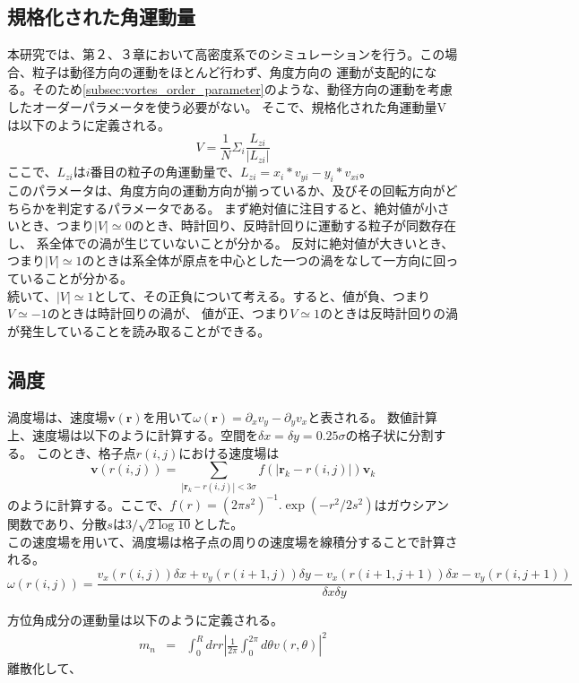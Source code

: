 \documentclass[/Users/ikedahajime/GitHub/reserch/master_report/thesis]{subfiles}
\begin{document}
\subsection{規格化された角運動量}
本研究では、第２、３章において高密度系でのシミュレーションを行う。この場合、粒子は動径方向の運動をほとんど行わず、角度方向の
運動が支配的になる。そのため\ref{subsec:vortes_order_parameter}のような、動径方向の運動を考慮したオーダーパラメータを使う必要がない。
そこで、規格化された角運動量V\cite{jiangEmergenceCollectiveDynamical2017}\cite{capriniCollectiveEffectsConfined2021}は以下のように定義される。
\begin{equation}
    V=\frac{1}{N}\Sigma_i \frac{L_{zi}}{ |L_{zi}|}
\end{equation}
ここで、$L_{zi}$は$i$番目の粒子の角運動量で、$L_{zi}=x_i*v_{yi}-y_i*v_{xi}$。\\
このパラメータは、角度方向の運動方向が揃っているか、及びその回転方向がどちらかを判定するパラメータである。
まず絶対値に注目すると、絶対値が小さいとき、つまり$|V|\simeq 0$のとき、時計回り、反時計回りに運動する粒子が同数存在し、
系全体での渦が生じていないことが分かる。
反対に絶対値が大きいとき、つまり$|V|\simeq 1$のときは系全体が原点を中心とした一つの渦をなして一方向に回っていることが分かる。\\
続いて、$|V|\simeq 1$として、その正負について考える。すると、値が負、つまり$V\simeq -1$のときは時計回りの渦が、
値が正、つまり$V\simeq 1$のときは反時計回りの渦が発生していることを読み取ることができる。

\subsection{渦度}
渦度場は、速度場$\bm{v}(\bm{r})$を用いて$\omega(\bm{r})=\partial_x v_y -\partial_y v_x$と表される。
数値計算上、速度場は以下のように計算する。空間を$\delta x=\delta y=0.25 \sigma$の格子状に分割する。
このとき、格子点$r(i,j)$における速度場は%
\begin{equation}
    \bm{v}(r(i,j))=\sum_{\left|\bm{r}_k-r(i,j)\right|<3\sigma} f(\left|\bm{r}_k-r(i,j)\right|)\bm{v}_k
\end{equation}
のように計算する。ここで、$f(r)=(2\pi s^2)^{-1}. \exp(-r^2/2s^2)$はガウシアン関数であり、分散$s$は$3/\sqrt{2\log 10}$とした。\\
この速度場を用いて、渦度場は格子点の周りの速度場を線積分することで計算される。
\begin{equation}
    \omega (r(i,j))=\frac{v_x(r(i,j))\delta x +v_y(r(i+1,j)) \delta y -v_x(r(i+1,j+1))\delta x -v_y(r(i,j+1))}{\delta x \delta y}
\end{equation}


方位角成分の運動量は以下のように定義される。
\begin{eqnarray}
    m_n &=& \int_0^Rdr r\left|\frac{1}{2\pi}\int_0^{2\pi}d\theta v(r,\theta)\right|^2
\end{eqnarray}
離散化して、
\ifSubfilesClassLoaded{
    \printbibliography[title=参考文献]
    }{}
\end{document}

